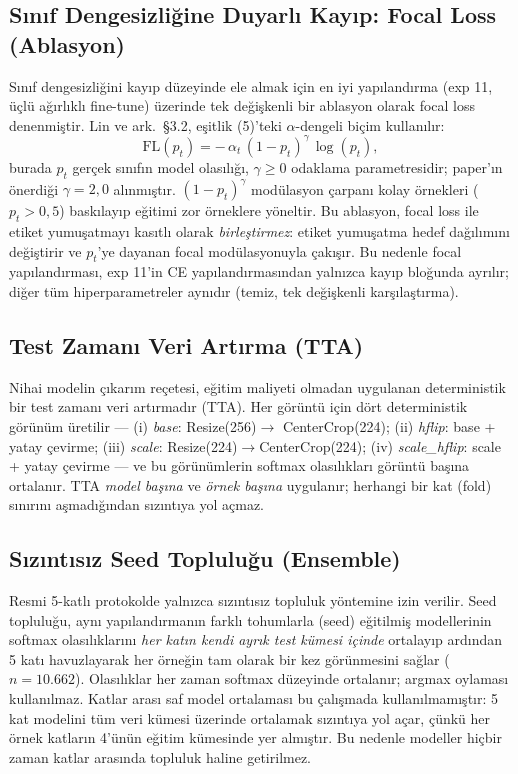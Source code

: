 \subsection{Sınıf Dengesizliğine Duyarlı Kayıp: Focal Loss (Ablasyon)}
\label{subsec:focal}
Sınıf dengesizliğini kayıp düzeyinde ele almak için en iyi yapılandırma (exp 11,
üçlü ağırlıklı fine-tune) üzerinde tek değişkenli bir ablasyon olarak focal
loss~\cite{lin2017focal} denenmiştir. Lin ve ark.\ §3.2, eşitlik
(5)'teki $\alpha$-dengeli biçim kullanılır:
\begin{equation}
  \mathrm{FL}(p_t) = -\,\alpha_t\,(1 - p_t)^{\gamma}\,\log(p_t),
\end{equation}
burada $p_t$ gerçek sınıfın model olasılığı, $\gamma \ge 0$ odaklama
parametresidir; paper'ın önerdiği $\gamma = 2{,}0$ alınmıştır. $(1-p_t)^{\gamma}$
modülasyon çarpanı kolay örnekleri ($p_t > 0{,}5$) baskılayıp eğitimi zor
örneklere yöneltir. Bu ablasyon, focal loss ile etiket yumuşatmayı kasıtlı
olarak \emph{birleştirmez}: etiket yumuşatma hedef dağılımını değiştirir ve
$p_t$'ye dayanan focal modülasyonuyla çakışır. Bu nedenle focal yapılandırması,
exp 11'in CE yapılandırmasından yalnızca kayıp bloğunda ayrılır; diğer tüm
hiperparametreler aynıdır (temiz, tek değişkenli karşılaştırma).

\subsection{Test Zamanı Veri Artırma (TTA)}
\label{subsec:tta}
Nihai modelin çıkarım reçetesi, eğitim maliyeti olmadan uygulanan
deterministik bir test zamanı veri artırmadır (TTA). Her görüntü için dört
deterministik görünüm üretilir --- (i) \emph{base}: Resize(256)$\rightarrow$
CenterCrop(224); (ii) \emph{hflip}: base + yatay çevirme; (iii) \emph{scale}:
Resize(224)$\rightarrow$CenterCrop(224); (iv) \emph{scale\_hflip}: scale + yatay
çevirme --- ve bu görünümlerin softmax olasılıkları görüntü başına ortalanır. TTA
\emph{model başına} ve \emph{örnek başına} uygulanır; herhangi bir kat (fold)
sınırını aşmadığından sızıntıya yol açmaz.

\subsection{Sızıntısız Seed Topluluğu (Ensemble)}
\label{subsec:ensemble}
Resmi 5-katlı protokolde yalnızca sızıntısız topluluk yöntemine izin verilir.
Seed topluluğu, aynı yapılandırmanın farklı tohumlarla (seed)
eğitilmiş modellerinin softmax olasılıklarını \emph{her katın kendi ayrık test
kümesi içinde} ortalayıp ardından 5 katı havuzlayarak her örneğin tam olarak bir
kez görünmesini sağlar ($n = 10{.}662$). Olasılıklar her zaman softmax düzeyinde
ortalanır; argmax oylaması kullanılmaz. Katlar arası saf model ortalaması bu
çalışmada kullanılmamıştır: 5 kat modelini tüm veri kümesi üzerinde ortalamak
sızıntıya yol açar,
çünkü her örnek katların 4'ünün eğitim kümesinde yer almıştır. Bu nedenle
modeller hiçbir zaman katlar arasında topluluk haline getirilmez.

